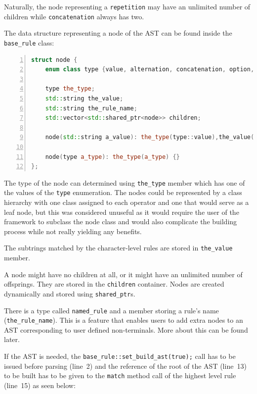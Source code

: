 \documentclass[12pt]{article}
\begin{document}
Naturally, the node representing a \texttt{repetition} may have an unlimited number of children while
\texttt{concatenation} always has two.

The data structure representing a node of the AST can be found inside the \texttt{base\_rule} class:
\begin{center}
	\begin{minipage}[h]{0.9\textwidth}
		\begin{lstlisting}[language=C++, breaklines=true, numbers=left]
struct node {
	enum class type {value, alternation, concatenation, option, repetition, repetition_or_epsilon, named_rule};

	type the_type;
	std::string the_value;
	std::string the_rule_name;
	std::vector<std::shared_ptr<node>> children;

	node(std::string a_value): the_type(type::value),the_value(a_value) {}

	node(type a_type): the_type(a_type) {}
};
		\end{lstlisting}
	\end{minipage}
\end{center}

The type of the node can determined using \texttt{the\_type} member which has one of the values of the
\texttt{type} enumeration. The nodes could be represented by a class hierarchy with one class assigned to each
operator and one that would serve as a leaf node, but this was considered unuseful as it would require the
user of the framework to subclass the node class and would also complicate the building process while not
really yielding any benefits.

The subtrings matched by the character-level rules are stored in \texttt{the\_value} member.

A node might have no children at all, or it might have an unlimited number of offsprings. They are stored in
the \texttt{children} container. Nodes are created dynamically and stored using \texttt{shared\_ptr}s. 

There is a type called \texttt{named\_rule} and a member storing a rule's name (\texttt{the\_rule\_name}).
This is a feature that enables users to add extra nodes to an AST corresponding to user defined non-terminals.
More about this can be found later.

If the AST is needed, the \texttt{base\_rule::set\_build\_ast(true);} call has to be issued before parsing
(line~2) and the reference of the root of the AST (line~13) to be built has to be given to the \texttt{match}
method call of the highest level rule (line~15) as seen below:
\end{document}
